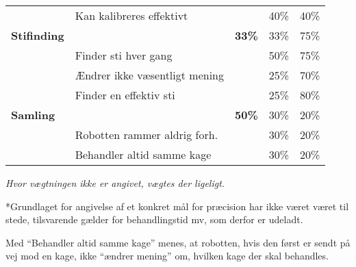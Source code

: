\begin{footnotesize}
\begin{center}
\begin{tabular}{l | l | r r r}
	& Kan kalibreres effektivt & & 40\% & 40\% \\
	\hspace*{0.3cm}\hspace*{0.3cm} \textbf{Stifinding}
																&		&	\textbf{33\%} & 	33\% & 75\% \\
	& Finder sti hver gang & & 50\% & 75\% \\
	& Ændrer ikke væsentligt mening & & 25\% & 70\% \\
	& Finder en effektiv sti & & 25\% & 80\% \\
	\hspace*{0.3cm} \textbf{Samling}
																&		&\textbf{50\%}		& 	30\%	& 20\% \\
	& Robotten rammer aldrig forh. & & 30\% & 20\% \\
	& Behandler altid samme kage & & 30\% & 20\%
\end{tabular}
\end{center}
\end{footnotesize}
\textit{Hvor vægtningen ikke er angivet, vægtes der ligeligt.}

*Grundlaget for angivelse af et konkret mål for præcision har ikke været  været til stede, tilsvarende gælder for behandlingstid mv, som derfor er udeladt.

Med "`Behandler altid samme kage"' menes, at robotten, hvis den først er sendt på vej mod en kage, ikke "`ændrer mening"' om, hvilken kage der skal behandles.